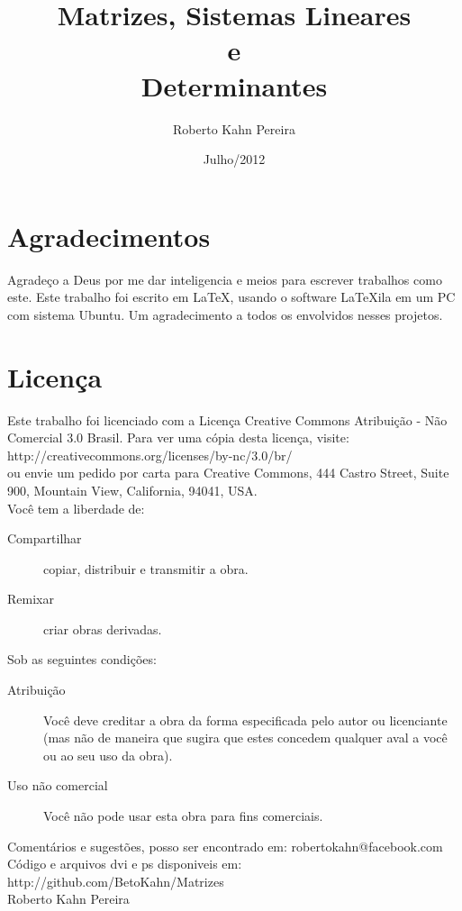 \documentclass[10pt, a4paper, onecolumn, final]{article}
\title{Matrizes, Sistemas Lineares\\ e \\Determinantes}
\author{Roberto Kahn Pereira}
\date{Julho/2012}
\begin{document}
\maketitle
\vfill
\newpage
\tableofcontents
\newpage
\section*{Agradecimentos}
Agradeço a Deus por me dar inteligencia e meios para escrever trabalhos como este. Este trabalho foi escrito em \LaTeX, usando o software LaTeXila em um PC com sistema Ubuntu. Um agradecimento a todos os envolvidos nesses projetos.
\section*{Licença}
Este trabalho foi licenciado com a Licença Creative Commons Atribuição - Não Comercial 3.0 Brasil. Para ver uma cópia desta licença, visite:\\http://creativecommons.org/licenses/by-nc/3.0/br/\\ ou envie um pedido por carta para Creative Commons, 444 Castro Street, Suite 900, Mountain View, California, 94041, USA.\\
Você tem a liberdade de:
\begin{description}
    \item[Compartilhar] copiar, distribuir e transmitir a obra.
    \item [Remixar] criar obras derivadas.
\end{description}
Sob as seguintes condições:
\begin{description}
    \item[Atribuição] Você deve creditar a obra da forma especificada pelo autor ou licenciante (mas não de maneira que sugira que estes concedem qualquer aval a você ou ao seu uso da obra).
    \item[Uso não comercial] Você não pode usar esta obra para fins comerciais.
\end{description}
Comentários e sugestões, posso ser encontrado em: robertokahn@facebook.com\\
Código e arquivos dvi e ps disponiveis em:\\http://github.com/BetoKahn/Matrizes\\[0.5cm]
     Roberto Kahn Pereira
\end{document}
